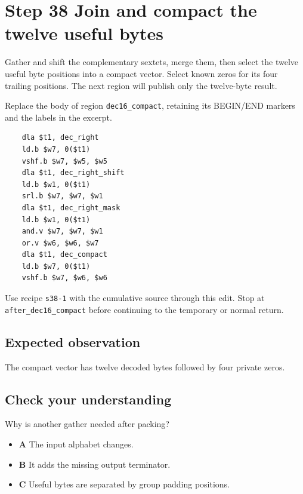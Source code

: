 \section{Step 38 Join and compact the twelve useful bytes}\label{base64-s38}

Gather and shift the complementary sextets, merge them, then select the twelve useful byte positions into a compact vector. Select known zeros for its four trailing positions. The next region will publish only the twelve-byte result.

Replace the body of region \texttt{dec16\_compact}, retaining its BEGIN/END markers and the labels in the excerpt.

\begin{verbatim}
    dla $t1, dec_right
    ld.b $w7, 0($t1)
    vshf.b $w7, $w5, $w5
    dla $t1, dec_right_shift
    ld.b $w1, 0($t1)
    srl.b $w7, $w7, $w1
    dla $t1, dec_right_mask
    ld.b $w1, 0($t1)
    and.v $w7, $w7, $w1
    or.v $w6, $w6, $w7
    dla $t1, dec_compact
    ld.b $w7, 0($t1)
    vshf.b $w7, $w6, $w6
\end{verbatim}

Use recipe \texttt{s38-1} with the cumulative source through this edit. Stop at \texttt{after\_dec16\_compact} before continuing to the temporary or normal return.

\subsection{Expected observation}
The compact vector has twelve decoded bytes followed by four private zeros.

\subsection{Check your understanding}
Why is another gather needed after packing?

\begin{itemize}
  \item \textbf{A} The input alphabet changes.
  \item \textbf{B} It adds the missing output terminator.
  \item \textbf{C} Useful bytes are separated by group padding positions.
\end{itemize}
